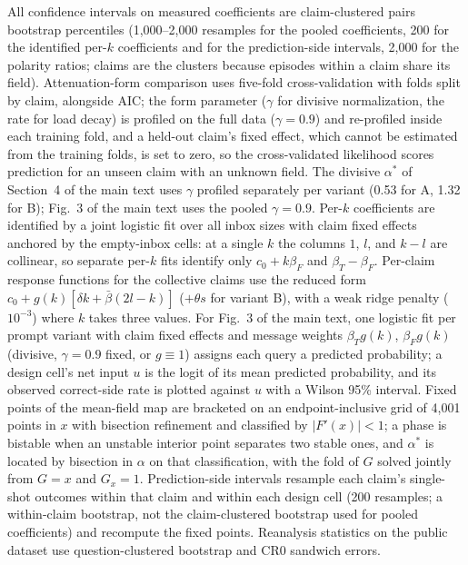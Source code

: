 \documentclass[11pt]{article}
\newcommand{\astar}{\alpha^{*}}
\begin{document}
All confidence intervals on measured coefficients are claim-clustered pairs
bootstrap percentiles (1{,}000--2{,}000 resamples for the pooled
coefficients, 200 for the identified per-$k$ coefficients and for the
prediction-side intervals, 2{,}000 for the polarity ratios; claims are the
clusters because episodes within a claim share its field). Attenuation-form comparison
uses five-fold cross-validation with folds split by claim, alongside AIC; the
form parameter ($\gamma$ for divisive normalization, the rate for load decay)
is profiled on the full data ($\gamma = 0.9$) and re-profiled inside each
training fold, and a held-out claim's fixed effect, which cannot be estimated
from the training folds, is set to zero, so the cross-validated likelihood
scores prediction for an unseen claim with an unknown field. The divisive
$\astar$ of Section~4 of the main text uses $\gamma$ profiled separately
per variant (0.53 for A, 1.32 for B); Fig.~3 of the main text uses the pooled
$\gamma = 0.9$. Per-$k$ coefficients are identified by a joint logistic fit
over all inbox sizes with claim fixed effects anchored by the empty-inbox
cells: at a single $k$ the columns $1$, $l$, and $k - l$ are collinear, so
separate per-$k$ fits identify only $c_0 + k\beta_F$ and $\beta_T - \beta_F$.
Per-claim response functions for the collective claims use the reduced form
$c_0 + g(k)[\delta k + \bar\beta(2l - k)]$ ($+\theta s$ for variant B), with
a weak ridge penalty ($10^{-3}$) where $k$ takes three values. For Fig.~3 of the main text, one logistic fit per prompt variant
with claim fixed effects and message weights $\beta_T g(k)$, $\beta_F g(k)$
(divisive, $\gamma = 0.9$ fixed, or $g \equiv 1$) assigns each query a
predicted probability; a design cell's net input $u$ is the logit of its mean
predicted probability, and its observed correct-side rate is plotted against
$u$ with a Wilson 95\% interval. Fixed points of the mean-field map are
bracketed on an endpoint-inclusive grid of 4{,}001 points in $x$ with
bisection refinement and classified by $|F'(x)| < 1$; a phase is bistable
when an unstable interior point separates two stable ones, and $\astar$ is
located by bisection in $\alpha$ on that classification, with the fold of $G$
solved jointly from $G = x$ and $G_x = 1$. Prediction-side intervals resample
each claim's single-shot outcomes within that claim and within each design
cell (200 resamples; a within-claim bootstrap, not the claim-clustered
bootstrap used for pooled coefficients) and recompute the fixed points. Reanalysis statistics on the public dataset use
question-clustered bootstrap and CR0 sandwich errors.
\end{document}

